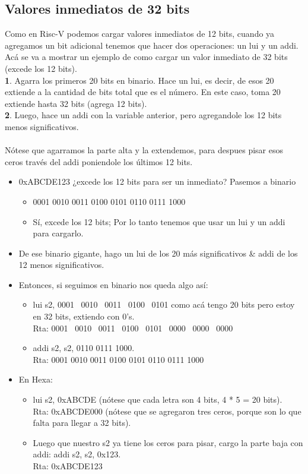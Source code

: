 \documentclass[10pt,a4paper]{article}
\begin{document}
\subsection*{Valores inmediatos de 32 bits}
Como en Risc-V podemos cargar valores inmediatos de 12 bits, cuando ya agregamos un bit adicional tenemos que hacer dos operaciones: un lui y un addi. \\
Acá se va a mostrar un ejemplo de como cargar un valor inmediato de 32 bits (excede los 12 bits). \\ 
\textbf{1}. Agarra los primeros 20 bits en binario. Hace un lui, es decir, de esos 20 extiende a la cantidad de bits total que es el número. En este caso, toma 20 extiende hasta 32 bits (agrega 12 bits). \\
\textbf{2}. Luego, hace un addi con la variable anterior, pero agregandole los 12 bits menos significativos. \\ \\ 
Nótese que agarramos la parte alta y la extendemos, para despues pisar esos ceros través del addi poniendole los últimos 12 bits. 
\begin{itemize}
    \item 0xABCDE123 ¿excede los 12 bits para ser un inmediato? Pasemos a binario
    \begin{itemize}
        \item 0001 0010 0011 0100 0101 0110 0111 1000
        \item Sí, excede los 12 bits; Por lo tanto tenemos que usar un lui y un addi para cargarlo.
    \end{itemize}
    \item De ese binario gigante, hago un lui de los 20 más significativos \& addi de los 12 menos significativos.
    \item Entonces, si seguimos en binario nos queda algo así:
    \begin{itemize}
        \item lui s2, 0001 \ 0010 \ 0011 \ 0100 \ 0101 como acá tengo 20 bits pero estoy en 32 bits, extiendo con 0's. \\ Rta: 0001 \ 0010 \ 0011 \ 0100 \ 0101 \ 0000 \ 0000 \ 0000
        \item addi s2, s2, 0110 0111 1000. \\ Rta: 0001 0010 0011 0100 0101 0110 0111 1000
    \end{itemize} 
    \item En Hexa:
    \begin{itemize}
        \item lui s2, 0xABCDE (nótese que cada letra son 4 bits, 4 * 5 = 20 bits). \\ Rta: 0xABCDE000 (nótese que se agregaron tres ceros, porque son lo que falta para llegar a 32 bits).
        \item Luego que nuestro s2 ya tiene los ceros para pisar, cargo la parte baja con addi: addi s2, s2, 0x123. \\ Rta: 0xABCDE123 
    \end{itemize}
\end{itemize}
\end{document}

